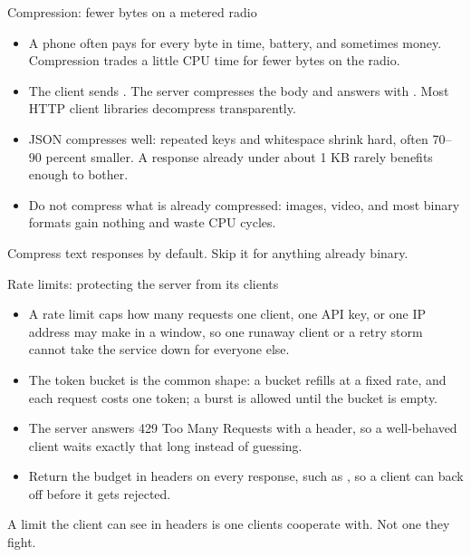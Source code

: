 \documentclass[10pt,aspectratio=169,t]{beamer}
\begin{document}
\begin{frame}[eyebrow=API design]{Compression: fewer bytes on a metered radio}
  \vskip 1mm
  \begin{itemize}
    \item A phone often pays for every byte in time, battery, and sometimes money. Compression trades a little CPU time for fewer bytes on the radio.
    \item The client sends . The server compresses the body and answers with . Most HTTP client libraries decompress transparently.
    \item JSON compresses well: repeated keys and whitespace shrink hard, often 70–90 percent smaller. A response already under about 1 KB rarely benefits enough to bother.
    \item Do not compress what is already compressed: images, video, and most binary formats gain nothing and waste CPU cycles.
  \end{itemize}
  \begin{takeaway}{Compress text responses by default.}
    Skip it for anything already binary.
  \end{takeaway}
\end{frame}

\begin{frame}[eyebrow=API design]{Rate limits: protecting the server from its clients}
  \vskip 1mm
  \begin{itemize}
    \item A rate limit caps how many requests one client, one API key, or one IP address may make in a window, so one runaway client or a retry storm cannot take the service down for everyone else.
    \item The token bucket is the common shape: a bucket refills at a fixed rate, and each request costs one token; a burst is allowed until the bucket is empty.
    \item The server answers 429 Too Many Requests with a  header, so a well-behaved client waits exactly that long instead of guessing.
    \item Return the budget in headers on every response, such as , so a client can back off before it gets rejected.
  \end{itemize}
  \begin{takeaway}{A limit the client can see in headers is one clients cooperate with.}
    Not one they fight.
  \end{takeaway}
\end{frame}
\end{document}

